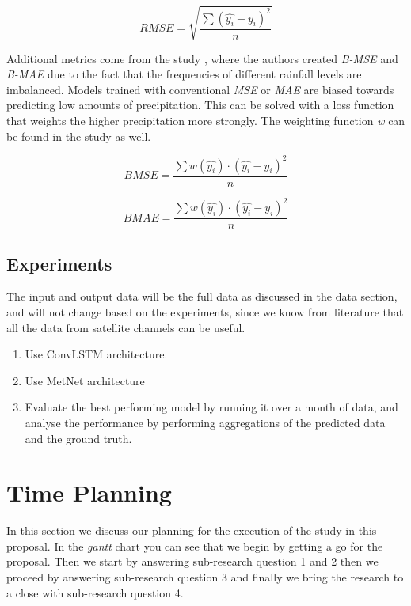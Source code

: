 \documentclass[acmtog, authorversion]{acmart}
\begin{document}
\begin{equation}
RMSE = \sqrt{\frac{\sum (\hat{y_i} -y_i)^2}{n}}
\end{equation}

Additional metrics come from the study \cite{shi2017deep}, where the authors created \textit{B-MSE} and \textit{B-MAE} due to the fact that the frequencies of different rainfall levels are imbalanced. Models trained with conventional \textit{MSE} or \textit{MAE} are biased towards predicting low amounts of precipitation. This can be solved with a loss function that weights the higher precipitation more strongly. The weighting function \textit{w} can be found in the study as well.

\begin{equation}
BMSE = \frac{\sum w(\hat{y_i}) \cdot (\hat{y_i} -y_i)^2}{n}
\end{equation}

\begin{equation}
BMAE = \frac{\sum w(\hat{y_i})  \cdot (\hat{y_i} -y_i)^2}{n}
\end{equation}

\subsection{Experiments}

The input and output data will be the full data as discussed in the data section, and will not change based on the experiments, since we know from literature that all the data from satellite channels can be useful.

\begin{enumerate}
    \item Use ConvLSTM architecture.
    \item Use MetNet architecture
    \item Evaluate the best performing model by running it over a month of data, and analyse the performance by performing aggregations of the predicted data and the ground truth.
\end{enumerate}

\section{Time Planning}
In this section we discuss our planning for the execution of the study in this proposal. In the \textit{gantt} chart you can see that we begin by getting a go for the proposal. Then we start by answering sub-research question 1 and 2 then we proceed by answering sub-research question 3 and finally we bring the research to a close with sub-research question 4.
\end{document}
